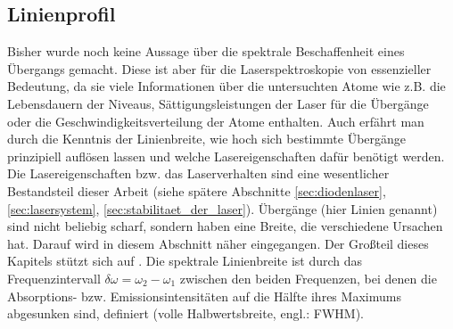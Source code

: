 \subsection{Linienprofil}\label{sec:linienprofil}
Bisher wurde noch keine Aussage über die spektrale Beschaffenheit eines
Übergangs gemacht. Diese ist aber für die Laserspektroskopie von essenzieller
Bedeutung, da sie viele Informationen über die untersuchten Atome wie z.B. die
Lebensdauern der Niveaus, Sättigungsleistungen der Laser für die Übergänge oder
die Geschwindigkeitsverteilung der Atome enthalten. Auch erfährt man durch die
Kenntnis der Linienbreite, wie hoch sich bestimmte Übergänge prinzipiell
auflösen lassen und welche Lasereigenschaften dafür benötigt werden. Die
Lasereigenschaften bzw. das Laserverhalten sind eine wesentlicher Bestandsteil
dieser Arbeit (siehe spätere Abschnitte \ref{sec:diodenlaser},
\ref{sec:lasersystem}, \ref{sec:stabilitaet_der_laser}). Übergänge (hier Linien genannt) sind nicht beliebig scharf, sondern
haben eine Breite, die verschiedene Ursachen hat. Darauf wird in diesem Abschnitt
näher eingegangen. Der Großteil dieses Kapitels stützt sich auf
\cite{demtroeder:laserspektroskopie}. Die spektrale Linienbreite ist durch das
Frequenzintervall $\delta\omega=\omega_2-\omega_1$ zwischen den beiden
Frequenzen, bei denen die Absorptions- bzw. Emissionsintensitäten auf die Hälfte
ihres Maximums abgesunken sind, definiert (volle Halbwertsbreite, engl.:
FWHM).

